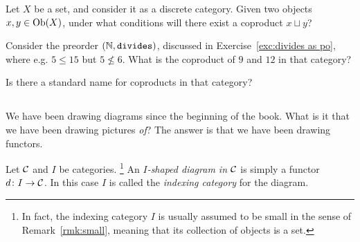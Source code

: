 \documentclass[CT4S-EN-RU]{subfiles}
\begin{document}
\begin{exerciseRUS}
\end{exerciseRUS}

\begin{exerciseENG}
Let $X$ be a set, and consider it as a discrete category. Given two objects $x,y\in\textnormal{Ob}(X)$, under what conditions will there exist a coproduct $x\sqcup y$?
\end{exerciseENG}

\begin{exerciseRUS}
\end{exerciseRUS}

\begin{exerciseENG}
Consider the preorder $({\mathbb N},{\tt divides})$, discussed in Exercise~\ref{exc:divides as po}, where e.g. $5\leq 15$ but $5\not\leq 6$. \sexc What is the coproduct of $9$ and $12$ in that category?
\item Is there a standard name for coproducts in that category?
\endsexc
\end{exerciseENG}

\begin{exerciseRUS}
\end{exerciseRUS}


\subsection{}\label{sec:diagrams in a category}

\begin{blockENG}
We have been drawing diagrams since the beginning of the book. What is it that we have been drawing pictures {\em of}? The answer is that we have been drawing functors.
\end{blockENG}

\begin{blockRUS}
\end{blockRUS}

\begin{definitionENG}
Let $\mathcal{C}$ and $I$ be categories.
\footnote{In fact, the indexing category $I$ is usually assumed to be small in the sense of Remark~\ref{rmk:small}, meaning that its collection of objects is a set.}
An {\em $I$-shaped diagram in $\mathcal{C}$} is simply a functor $d\colon I\rightarrow\mathcal{C}$. In this case $I$ is called the {\em indexing category} for the diagram.
\end{definitionENG}
\end{document}
